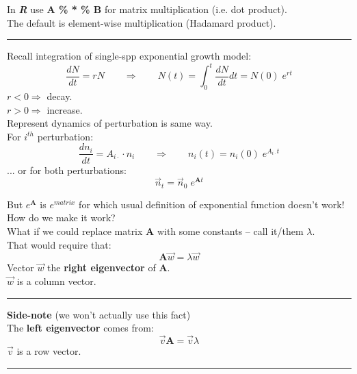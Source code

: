 \documentclass{article}
\newcommand{\note}[1]{\colorbox{gray!30}{#1}}
\newcommand{\ind}{\-\hspace{1cm}}
\begin{document}
\note{In \emph{\textbf{R}} use \textbf{A \% * \% B} for matrix multiplication (i.e. dot product).}\\
\ind \note{The default is element-wise multiplication (Hadamard product).}

\rule[0.5ex]{\linewidth}{1pt}

Recall integration of single-spp exponential growth model:
\begin{equation*}
	\frac{dN}{dt}=rN \quad \quad \Rightarrow \quad \quad N(t) = \int_{0}^{t} \frac{dN}{dt} dt = N(0) \; e^{rt}
\end{equation*}
\ind  $r<0 \Rightarrow$ decay.\\
\ind  $r>0 \Rightarrow$ increase.\\

Represent dynamics of perturbation is same way.\\
\ind For $i^{th}$ perturbation:
\begin{equation*}
	\frac{d n_i}{dt}= A_{i\cdot} \cdot n_i \quad \quad \Rightarrow \quad \quad n_i(t) = n_i(0) \; e^{A_{i \cdot}t}
\end{equation*} 
\ind ... or for both perturbations:
\begin{equation*}
	\vec{n}_t = \vec{n}_0 \; e^{\mathbf{A}t}
\end{equation*}

But $e^\mathbf{A}$ is $e^{matrix}$ for which usual definition of exponential function doesn't work!\\
How do we make it work? \\

What if we could replace matrix $\mathbf{A}$ with some constants -- call it/them $\lambda$.\\
That would require that:
\begin{equation*}
	\boxed{\mathbf{A} \vec{w} = \lambda \vec{w}}
\end{equation*}
Vector $\vec{w}$ the \textbf{right eigenvector} of $\mathbf{A}$.\\
\ind $\vec{w}$ is a column vector.\\

\rule[0.5ex]{\linewidth}{1pt}
\textbf{Side-note} (we won't actually use this fact)\\
\ind The \textbf{left eigenvector} comes from:
\begin{equation*}
	\vec{v}\mathbf{A} = \vec{v}\lambda
\end{equation*}
\ind \ind $\vec{v}$ is a row vector.

\rule[0.5ex]{\linewidth}{1pt}
\pagebreak
\end{document}
